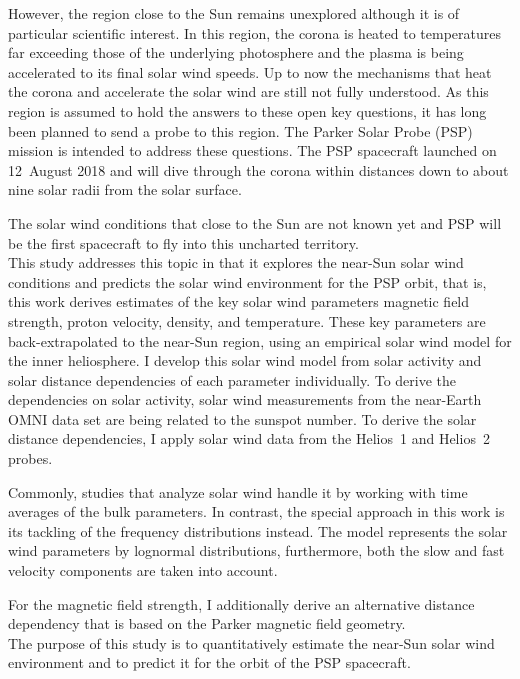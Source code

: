 However, the region close to the Sun remains unexplored although it is of particular scientific interest. In this region, the corona is heated to temperatures far exceeding those of the underlying photosphere and the plasma is being accelerated to its final solar wind speeds. Up to now the mechanisms that heat the corona and accelerate the solar wind are still not fully understood.
As this region is assumed to hold the answers to these open key questions, it has long been planned to send a probe to this region. The Parker Solar Probe (PSP) mission is intended to address these questions. The PSP spacecraft launched on 12~August 2018 and will dive through the corona within distances down to about nine solar radii from the solar surface.

The solar wind conditions that close to the Sun are not known yet and PSP will be the first spacecraft to fly into this uncharted territory.\\

This study addresses this topic in that it explores the near-Sun solar wind conditions and predicts the solar wind environment for the PSP orbit, that is, this work derives estimates of the key solar wind parameters magnetic field strength, proton velocity, density, and temperature. These key parameters are back-extrapolated to the near-Sun region, using an empirical solar wind model for the inner heliosphere.
I develop this solar wind model from solar activity and solar distance dependencies of each parameter individually. To derive the dependencies on solar activity, solar wind measurements from the near-Earth OMNI data set are being related to the sunspot number. To derive the solar distance dependencies, I apply solar wind data from the Helios~1 and Helios~2 probes.

Commonly, studies that analyze solar wind handle it by working with time averages of the bulk parameters. In contrast, the special approach in this work is its tackling of the frequency distributions instead. The model represents the solar wind parameters by lognormal distributions, furthermore, both the slow and fast velocity components are taken into account.

For the magnetic field strength, I additionally derive an alternative distance dependency that is based on the Parker magnetic field geometry.\\

The purpose of this study is to quantitatively estimate the near-Sun solar wind environment and to predict it for the orbit of the PSP spacecraft.

